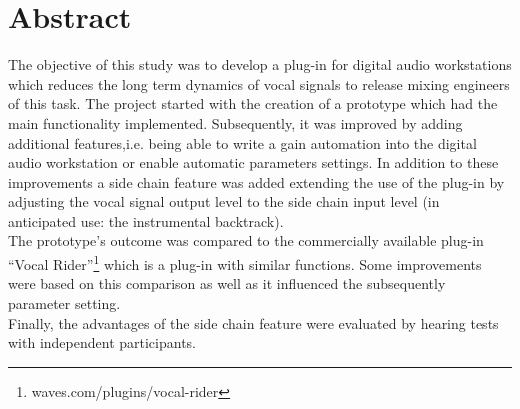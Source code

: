 \chapter*{Abstract}

The objective of this study was to develop a plug-in for digital audio workstations which reduces the long term dynamics of vocal signals to release mixing engineers of this task. The project started with the creation of a prototype which had the main functionality implemented. Subsequently, it was improved by adding additional features,i.e. being able to write a gain automation into the digital audio workstation or enable automatic parameters settings. In addition to these improvements a side chain feature was added extending the use of the plug-in by adjusting the vocal signal output level to the side chain input level (in anticipated use: the instrumental backtrack).\\
The prototype's outcome was compared to the commercially available plug-in “Vocal Rider”\footnote{waves.com/plugins/vocal-rider} which is a plug-in with similar functions. Some improvements were based on this comparison as well as it influenced the subsequently parameter setting.\\
Finally, the advantages of the side chain feature were evaluated by hearing tests with independent participants.\\